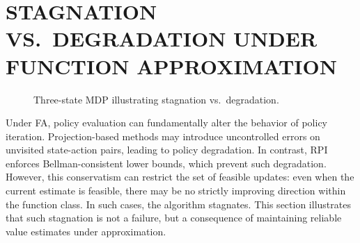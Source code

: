 \documentclass[twoside]{article}
\theoremstyle{plain}
\theoremstyle{definition}
\theoremstyle{remark}
\begin{document}
\section{STAGNATION VS.\ DEGRADATION UNDER FUNCTION APPROXIMATION}
\label{sec:limitations}

\begin{figure}[t]
\centering
{}

\caption{
Three-state MDP illustrating stagnation vs.\ degradation.
}

\label{fig:rpi_stagnation_mdp}
\end{figure}

Under FA, policy evaluation can fundamentally alter the behavior of policy iteration. Projection-based methods may introduce uncontrolled errors on unvisited state-action pairs, leading to policy degradation. In contrast, RPI enforces Bellman-consistent lower bounds, which prevent such degradation. However, this conservatism can restrict the set of feasible updates: even when the current estimate is feasible, there may be no strictly improving direction within the function class. In such cases, the algorithm stagnates. This section illustrates that such stagnation is not a failure, but a consequence of maintaining reliable value estimates under approximation.
\end{document}
